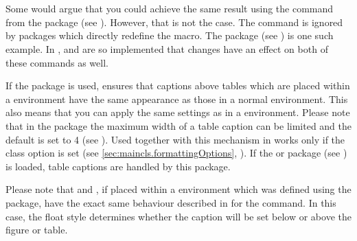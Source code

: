\begin{Declaration}
  \\
  \\
\end{Declaration}%
%
%
%
\begin{Explain}
  Some would argue that you could achieve the same result using the
   command from the 
  package (see \cite{package:topcapt}). However,
  that is not the case. The command  is ignored by
  packages which directly redefine the  macro. The
   package (see \cite{package:hyperref}) is one such
  example. In {\KOMAScript},  and
   are so implemented that changes have an effect
  on both of these commands as well.
  
  \label{desc:maincls.cmd.caption.longtable}%
  If the  package is used,
  {\KOMAScript} ensures that captions above tables which are placed
  within a  environment have the same
  appearance as those in a normal 
  environment. This also means that you can apply the same settings as
  in a  environment. Please note that in the
   package the maximum width of a table caption can
  be limited and the default is set to 4 (see
  \cite{package:longtable}). Used together with {\KOMAScript} this
  mechanism in  works only if the class option
   is set (see
  \autoref{sec:maincls.formattingOptions},
  ). If the
   or
   package (see
  \cite{package:caption}) is loaded, table captions are handled by
  this package.
  
  Please note that  and , if
  placed within a  environment which was defined
  using the  package, have the
  exact same behaviour described in \cite{package:float} for the
   command.  In this case, the float style determines
  whether the caption will be set below or above the figure or table.
\end{Explain}
%
%
%
%


